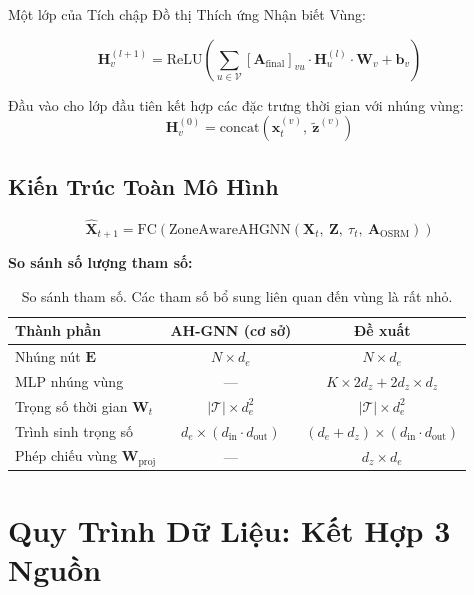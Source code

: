 \documentclass[12pt,a4paper]{article}
\begin{document}
Một lớp của Tích chập Đồ thị Thích ứng Nhận biết Vùng:

\begin{equation}
\mathbf{H}^{(l+1)}_v = \text{ReLU}\!\left(
\sum_{u \in \mathcal{V}} [\mathbf{A}_{\text{final}}]_{vu} \cdot
\mathbf{H}^{(l)}_u \cdot \mathbf{W}_v + \mathbf{b}_v
\right)
\end{equation}

Đầu vào cho lớp đầu tiên kết hợp các đặc trưng thời gian với nhúng vùng:
\begin{equation}
\mathbf{H}^{(0)}_v = \text{concat}\!\left(\mathbf{x}_t^{(v)},\ \tilde{\mathbf{z}}^{(v)}\right)
\end{equation}

\subsection{Kiến Trúc Toàn Mô Hình}

\begin{equation}
\hat{\mathbf{X}}_{t+1} = \text{FC}\!\left(
\text{ZoneAwareAHGNN}\!\left(\mathbf{X}_t,\ \mathbf{Z},\ \tau_t,\ \mathbf{A}_{\text{OSRM}}\right)
\right)
\end{equation}

\noindent\textbf{So sánh số lượng tham số:}

\begin{table}[h]
\centering
\begin{tabular}{lcc}
\toprule
\textbf{Thành phần} & \textbf{AH-GNN (cơ sở)} & \textbf{Đề xuất} \\
\midrule
Nhúng nút $\mathbf{E}$ & $N \times d_e$ & $N \times d_e$ \\
MLP nhúng vùng & --- & $K \times 2d_z + 2d_z \times d_z$ \\
Trọng số thời gian $\mathbf{W}_t$ & $|\mathcal{T}| \times d_e^2$ & $|\mathcal{T}| \times d_e^2$ \\
Trình sinh trọng số & $d_e \times (d_{\text{in}} \cdot d_{\text{out}})$ & $(d_e+d_z) \times (d_{\text{in}} \cdot d_{\text{out}})$ \\
Phép chiếu vùng $\mathbf{W}_{\text{proj}}$ & --- & $d_z \times d_e$ \\
\bottomrule
\end{tabular}
\caption{So sánh tham số. Các tham số bổ sung liên quan đến vùng là rất nhỏ.}
\end{table}

\section{Quy Trình Dữ Liệu: Kết Hợp 3 Nguồn}
\end{document}
